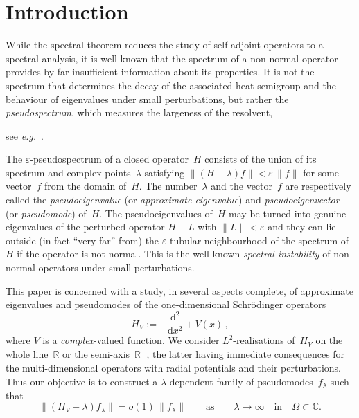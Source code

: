 \section{Introduction}
While the spectral theorem reduces the study of self-adjoint operators
to a spectral analysis, it is well known that the spectrum of a non-normal operator
provides by far insufficient information about its properties.
It is not the spectrum that determines the decay of the associated heat semigroup 
and the behaviour of eigenvalues under small perturbations,
but rather the \emph{pseudospectrum}, which measures the largeness of the resolvent, {see {\emph{e.g.}}~\cite{Trefethen-Embree,Davies_2007,KS-book}.

The ${\varepsilon}$-pseudospectrum of a closed operator~$H$ consists 
of the union of its spectrum and complex points~$\lambda$ satisfying 
$\|(H-\lambda)f\| < {\varepsilon} \, \|f\|$ for some vector~$f$ from the domain of~$H$. 
The number~$\lambda$ and the vector~$f$ are respectively called 
the \emph{pseudoeigenvalue} (or \emph{approximate eigenvalue})
and \emph{pseudoeigenvector} (or \emph{pseudomode}) of~$H$.
The pseudoeigenvalues of~$H$ may be turned into genuine eigenvalues 
of the perturbed operator $H+L$ with $\|L\| < {\varepsilon}$
and they can lie outside (in fact ``very far'' from)
the ${\varepsilon}$-tubular neighbourhood of 
the spectrum of~$H$ if the operator is not normal.
This is the well-known \emph{spectral instability} of 
non-normal operators under small perturbations.

This paper is concerned with a study, in several aspects complete, 
of approximate eigenvalues and pseudomodes 
of the one-dimensional Schr\"odinger operators
\begin{equation}\label{Hamiltonian.intro}
H_V := -\frac{{\mathrm{d}}^2}{{\mathrm{d}} x^2} + V(x)  
\,,
\end{equation}
where $V$ is a \emph{complex}-valued function.
We consider ${L^2}$-realisations of~$H_V$ 
on the whole line~${\mathbb{R}}$ or the semi-axis~${\mathbb{R}}_+$, the latter having 
immediate consequences for the multi-dimensional operators 
with radial potentials and their perturbations.
Thus our objective is to construct 
a $\lambda$-dependent family of pseudomodes~$f_\lambda$ such that 
\begin{equation}\label{objective.intro}
\| (H_V - \lambda) f_\lambda \| = o(1) \, \|f_\lambda\|
\qquad \text{as}\qquad 
\lambda \to \infty \quad \text{in} \quad \Omega \subset {\mathbb{C}}.
\end{equation}

}
